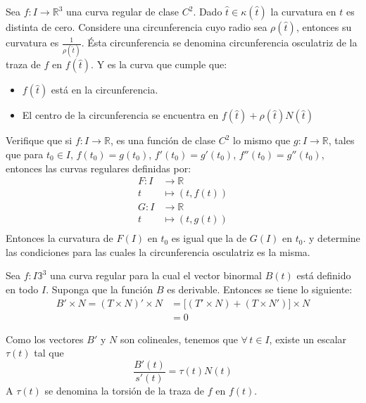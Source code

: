 Sea $f: I \to \mathbb{R}^3$ una curva regular de clase $C^2$. Dado $\hat{t} \in
\kappa (\hat{t})$ la curvatura en $t$ es distinta de cero. Considere una
circunferencia cuyo radio sea $\rho(\hat{t})$, entonces su curvatura es
$\frac{1}{\rho(\hat{t})}$. Ésta circunferencia se denomina circunferencia
osculatriz de la traza de $f$ en $f(\hat{t})$.
Y es la curva que cumple que:
\begin{itemize}
  \item $f(\hat{t})$ está en la circunferencia.
  \item El centro de la circunferencia se encuentra en $f(\hat{t}) +
    \rho(\hat{t})N(\hat{t})$ 
\end{itemize}
\begin{problem}
Verifique que si $f: I \to \mathbb{R}$, es una función de clase $C^2$ lo mismo
que $g: I \to \mathbb{R}$, tales que para $t_0 \in I$, $f(t_0) = g(t_0)$,
$f'(t_0) = g'(t_0)$, $f''(t_0) = g''(t_0)$, entonces las curvas regulares
definidas por:
\begin{align*}
  F: I &\to \mathbb{R} \\
  t &\mapsto (t,f(t)) \\
  G: I &\to \mathbb{R} \\
  t &\mapsto (t,g(t)) \\
\end{align*}
Entonces la curvatura de $F(I)$ en $t_0$ es igual que la de $G(I)$ en $t_0$. y
determine las condiciones para las cuales la circunferencia osculatriz es la
misma.
\end{problem}
Sea $f: I \mathbb{3}^3$ una curva regular para la cual el vector binormal $B(t)$
está definido en todo $I$. Suponga que la función $B$ es derivable. Entonces se
tiene lo siguiente:
\begin{align*}
  B' \times N = (T \times N)' \times N &= \big[(T' \times N ) + (T \times N')
  \big] \times N \\ 
                                       &= 0
\end{align*}
\begin{definition}
 Como los vectores $B'$ y $N$ son colineales, tenemos que  $\forall \, t \in I$,
 existe un escalar $\tau(t)$ tal que
 \[
   \frac{B'(t)}{s'(t)} = \tau(t) N (t)
 \]
 A $\tau(t)$ se denomina la torsión de la traza de $f$ en $f(t)$.
\end{definition}
